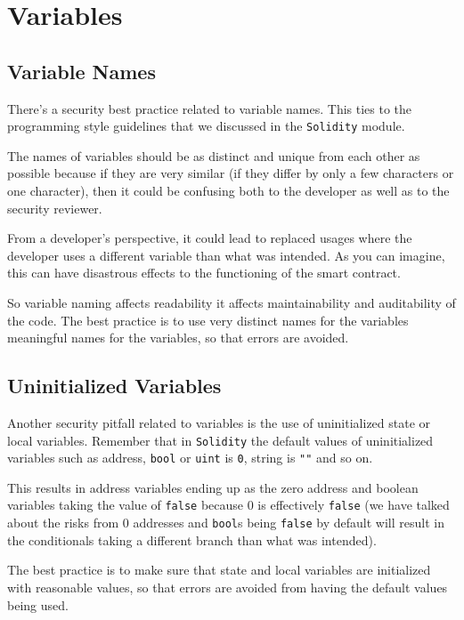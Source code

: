 \section{Variables}\label{variables}

\subsection{Variable Names}\label{variable-names}

There's a security best practice related to variable names. This ties to
the programming style guidelines that we discussed in the
\texttt{Solidity} module.

The names of variables should be as distinct and unique from each other
as possible because if they are very similar (if they differ by only a
few characters or one character), then it could be confusing both to the
developer as well as to the security reviewer.

From a developer's perspective, it could lead to replaced usages where
the developer uses a different variable than what was intended. As you
can imagine, this can have disastrous effects to the functioning of the
smart contract.

So variable naming affects readability it affects maintainability and
auditability of the code. The best practice is to use very distinct
names for the variables meaningful names for the variables, so that
errors are avoided.

\subsection{Uninitialized Variables}\label{uninitialized-variables}

Another security pitfall related to variables is the use of
uninitialized state or local variables. Remember that in
\texttt{Solidity} the default values of uninitialized variables such as
address, \texttt{bool} or \texttt{uint} is \texttt{0}, string is
\texttt{""} and so on.

This results in address variables ending up as the zero address and
boolean variables taking the value of \texttt{false} because 0 is
effectively \texttt{false} (we have talked about the risks from 0
addresses and \texttt{bool}s being \texttt{false} by default will result
in the conditionals taking a different branch than what was intended).

The best practice is to make sure that state and local variables are
initialized with reasonable values, so that errors are avoided from
having the default values being used.

